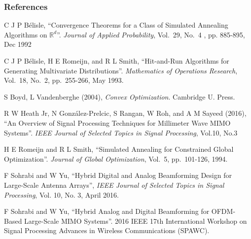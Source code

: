 \documentclass{beamer}
\begin{document}

\begin{frame}
\frametitle{References}
\begin{enumerate}
\scriptsize {

\item C J P B\'elisle, ``Convergence Theorems for a Class of Simulated Annealing Algorithms on \(\mathbb{R}^d\)''. \textit{Journal of Applied Probability}, Vol.\ 29, No.\ 4 , pp. 885-895, Dec 1992

\item C J P B\'elisle, H E Romeijn, and R L Smith, ``Hit-and-Run Algorithms for Generating Multivariate Distributions''. \textit{Mathematics of Operations Research}, Vol.\ 18, No.\ 2, pp.\ 255-266, May 1993.

\item S Boyd, L Vandenberghe (2004), \textit{Convex Optimization}. Cambridge U. Press.

\item R W Heath Jr, N González-Prelcic, S Rangan, W Roh, and A M Sayeed (2016), ``An Overview of Signal Processing Techniques for Millimeter Wave MIMO Systems''. \textit{IEEE Journal of Selected Topics in Signal Processing}, Vol.10, No.3

\item H E Romeijn and R L Smith, ``Simulated Annealing for Constrained Global Optimization''. \textit{Journal of Global Optimization}, Vol.\ 5, pp.\ 101-126, 1994.

\item F Sohrabi and W Yu, ``Hybrid Digital and Analog Beamforming Design for Large-Scale Antenna Arrays'', \textit{IEEE Journal of Selected Topics in Signal Processing}, Vol. 10, No. 3, April 2016.

\item F Sohrabi and W Yu, ``Hybrid Analog and Digital Beamforming for OFDM-Based Large-Scale MIMO Systems''. 2016 IEEE 17th International Workshop on Signal Processing Advances in Wireless Communications (SPAWC).

}

\end{enumerate}
\end{frame}
\end{document}

